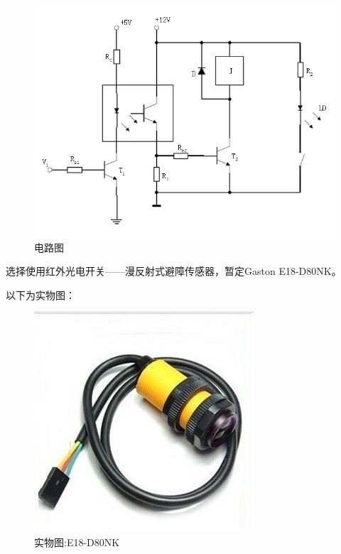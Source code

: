 \documentclass{ctexart}
\begin{document}
\begin{figure}[H]
\centering
    \includegraphics[width = \textwidth]{025}
    \caption{电路图}\par
\end{figure}
选择使用红外光电开关——漫反射式避障传感器，暂定Gaston E18-D80NK。\par
以下为实物图：\par
\begin{figure}[H]
\centering
    \includegraphics[width = \textwidth]{026}
    \caption{实物图:E18-D80NK}\par
\end{figure}
\end{document}
